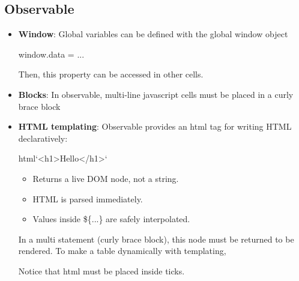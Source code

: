 \documentclass{report}
\begin{document}
    \subsection{Observable}
    \begin{itemize}
        \item \textbf{Window}: Global variables can be defined with the global window object
            \bigbreak \noindent 
            \begin{jscode}
            window.data = ...
            \end{jscode}
            \bigbreak \noindent 
            Then, this property can be accessed in other cells.
        \item \textbf{Blocks}: In observable, multi-line javascript cells must be placed in a curly brace block
        \item \textbf{HTML templating}: Observable provides an html tag for writing HTML declaratively:
            \bigbreak \noindent 
            \begin{jscode}
            html`<h1>Hello</h1>`
            \end{jscode}
            \begin{itemize}
                \item Returns a live DOM node, not a string.
                \item HTML is parsed immediately.
                \item Values inside \$\{...\} are safely interpolated.
            \end{itemize}
            In a multi statement (curly brace block), this node must be returned to be rendered.
            \bigbreak \noindent 
            To make a table dynamically with templating, 
            \bigbreak \noindent 
            \bigbreak \noindent 
            Notice that html must be placed inside ticks.
    \end{itemize}

    \pagebreak 
\end{document}
